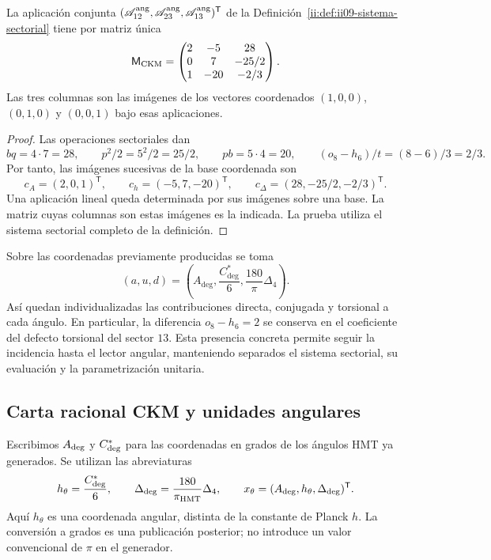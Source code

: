 \begin{theorem}
\label{ii:thm:ii09-matriz-sectorial}
La aplicación conjunta
\((\mathscr A_{12}^{\rm ang},\mathscr A_{23}^{\rm ang},
\mathscr A_{13}^{\rm ang})^{\mathsf T}\) de la
Definición~\ref{ii:def:ii09-sistema-sectorial} tiene por matriz única
\[
 \mathsf M_{\rm CKM}=
 \begin{pmatrix}
 2&-5&28\\
 0&7&-25/2\\
 1&-20&-2/3
 \end{pmatrix}.
\]
Las tres columnas son las imágenes de los vectores coordenados
\((1,0,0)\), \((0,1,0)\) y \((0,0,1)\) bajo esas aplicaciones.
\end{theorem}
\begin{proof}
Las operaciones sectoriales dan
\[
 bq=4\cdot7=28,\qquad p^2/2=5^2/2=25/2,
 \qquad pb=5\cdot4=20,\qquad
 (o_8-h_6)/t=(8-6)/3=2/3.
\]
Por tanto, las imágenes sucesivas de la base coordenada son
\[
 c_A=(2,0,1)^{\mathsf T},\qquad
 c_h=(-5,7,-20)^{\mathsf T},\qquad
 c_\Delta=(28,-25/2,-2/3)^{\mathsf T}.
\]
Una aplicación lineal queda determinada por sus imágenes sobre una
base. La matriz cuyas columnas son estas imágenes es la indicada.
La prueba utiliza el sistema sectorial completo de la definición.
\end{proof}

Sobre las coordenadas previamente producidas se toma
\[
 (a,u,d)=\left(A_{\deg},\frac{C^*_{\deg}}6,
                       \frac{180}{\pi}\Delta_4\right).
\]
Así quedan individualizadas las contribuciones directa, conjugada
y torsional a cada ángulo. En particular, la diferencia
\(o_8-h_6=2\) se conserva en el coeficiente del defecto torsional
del sector \(13\). Esta presencia concreta permite seguir la
incidencia hasta el lector angular, manteniendo separados el
sistema sectorial, su evaluación y la parametrización unitaria.



\subsection{Carta racional CKM y unidades angulares}

Escribimos \(A_{\rm deg}\) y \(C^*_{\rm deg}\) para las coordenadas en
grados de los ángulos HMT ya generados. Se utilizan las abreviaturas
\begin{equation}
 h_\theta=\frac{C^*_{\rm deg}}6,
 \qquad
 \Delta_{\rm deg}=\frac{180}{\pi_{\rm HMT}}\Delta_4,
 \qquad
 x_\theta=(A_{\rm deg},h_\theta,\Delta_{\rm deg})^{\mathsf T}.
 \label{ii:eq:ii-angular-chart}
\end{equation}
Aquí \(h_\theta\) es una coordenada angular, distinta de la constante de
Planck \(h\). La conversión a grados es una publicación posterior; no
introduce un valor convencional de \(\pi\) en el generador.

